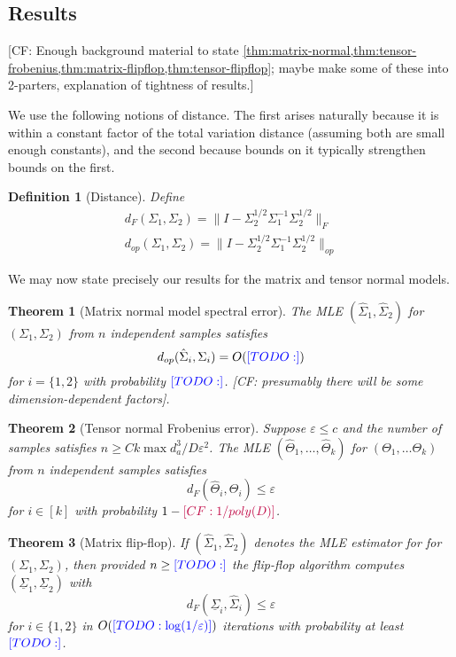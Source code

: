 \documentclass{article}
\newtheorem{theorem}{Theorem}
\newtheorem{definition}{Definition}
\newcommand\eps{\varepsilon}
\newcommand{\CF}[1]{{\color{purple}[CF: #1]}}
\newcommand{\TODO}[1]{{\color{blue}[TODO: #1]}}
\begin{document}
\subsection{Results}

\CF{Enough background material to state \cref{thm:matrix-normal,thm:tensor-frobenius,thm:matrix-flipflop,thm:tensor-flipflop}; maybe make some of these into 2-parters, explanation of tightness of results.}

We use the following notions of distance. The first arises naturally because it is within a constant factor of the total variation distance (assuming both are small enough constants), and the second because bounds on it typically strengthen bounds on the first. 

\begin{definition}[Distance]
Define 
\begin{align}d_{F}(\Sigma_1, \Sigma_2) = \| I - \Sigma_2^{1/2} \Sigma_1^{-1} \Sigma_2^{1/2}\|_F\\
d_{op}(\Sigma_1, \Sigma_2) = \| I - \Sigma_2^{1/2} \Sigma_1^{-1} \Sigma_2^{1/2}\|_{op}
\end{align}
\end{definition}
We may now state precisely our results for the matrix and tensor normal models.
\begin{theorem}[Matrix normal model spectral error]\label{thm:matrix-normal} The MLE $(\hat{\Sigma}_1,\hat{\Sigma}_2) $ for $(\Sigma_1, \Sigma_2)$ from $n$ independent samples satisfies 
$$ d_{op}(\hat{\Sigma}_i, \Sigma_i) = O(\TODO{}) $$
for $i = \{1,2\}$ with probability $\TODO{}$.
\CF{presumably there will be some dimension-dependent factors}.
\end{theorem}

\begin{theorem}[Tensor normal Frobenius error]\label{thm:tensor-frobenius} Suppose $\eps \leq c$ and the number of samples satisfies $n \geq C k \max d_{a}^3/D\eps^2$. The MLE $(\widehat{\Theta}_1, \dots, \widehat{\Theta}_k) $ for $(\Theta_1, \dots \Theta_k)$ from $n$ independent samples satisfies 
$$ d_{F}(\widehat{\Theta}_i, \Theta_i) \leq \eps $$
for $i \in [k]$ with probability $1 - \CF{1/poly(D)}$.
\end{theorem}


\begin{theorem}[Matrix flip-flop]\label{thm:matrix-flipflop} If $(\hat{\Sigma}_1, \hat{\Sigma}_2) $ denotes the MLE estimator for for $(\Sigma_1, \Sigma_2)$, then provided $n \geq \TODO{}$ the flip-flop algorithm computes $(\underline{\Sigma}_1, \underline{\Sigma}_2)$ with 
$$ d_F(\underline{\Sigma}_i, \hat{\Sigma}_i) \leq \eps $$
for $i \in \{1,2\}$ in $O(\TODO{\log(1/\eps)})$ iterations with probability at least $\TODO{}$.
\end{theorem}
\end{document}
